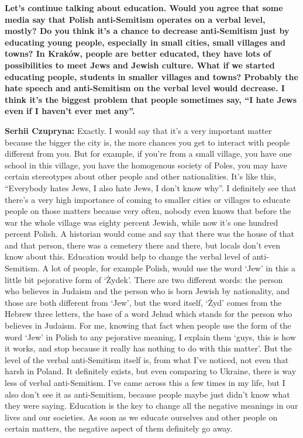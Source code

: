 \textbf{Let’s continue talking about education. Would you agree that some media say that Polish anti-Semitism operates on a verbal level, mostly? Do you think it’s a chance to decrease anti-Semitism just by educating young people, especially in small cities, small villages and towns? In Kraków, people are better educated, they have lots of possibilities to meet Jews and Jewish culture. What if we started educating people, students in smaller villages and towns? Probably the hate speech and anti-Semitism on the verbal level would decrease. I think it’s the biggest problem that people sometimes say, “I hate Jews even if I haven’t ever met any”.} \par
\textbf{Serhii Czupryna:} Exactly. I would say that it’s a very important matter because the bigger the city is, the more chances you get to interact with people different from you. But for example, if you’re from a small village, you have one school in this village, you have the homogenous society of Poles, you may have certain stereotypes about other people and other nationalities. It’s like this, “Everybody hates Jews, I also hate Jews, I don’t know why”. I definitely see that there’s a very high importance of coming to smaller cities or villages to educate people on those matters because very often, nobody even knows that before the war the whole village was eighty percent Jewish, while now it’s one hundred percent Polish. A historian would come and say that there was the house of that and that person, there was a cemetery there and there, but locals don’t even know about this. Education would help to change the verbal level of anti-Semitism. A lot of people, for example Polish, would use the word ‘Jew’ in this a little bit pejorative form of ‘Żydek’. There are two different words: the person who believes in Judaism and the person who is born Jewish by nationality, and those are both different from ‘Jew’, but the word itself, ‘Żyd’ comes from the Hebrew three letters, the base of a word Jehud which stands for the person who believes in Judaism. For me, knowing that fact when people use the form of the word ‘Jew’ in Polish to any pejorative meaning, I explain them ‘guys, this is how it works, and stop because it really has nothing to do with this matter’. But the level of the verbal anti-Semitism itself is, from what I’ve noticed, not even that harsh in Poland. It definitely exists, but even comparing to Ukraine, there is way less of verbal anti-Semitism. I’ve came across this a few times in my life, but I also don’t see it as anti-Semitism, because people maybe just didn’t know what they were saying. Education is the key to change all the negative meanings in our lives and our societies. As soon as we educate ourselves and other people on certain matters, the negative aspect of them definitely go away.\par 
